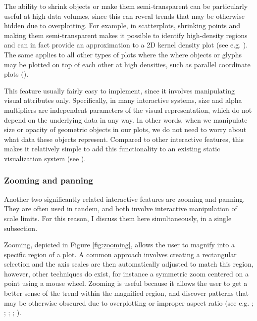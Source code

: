 \documentclass[
  openany]{book}
\theoremstyle{definition}
\theoremstyle{definition}
\theoremstyle{definition}
\theoremstyle{definition}
\theoremstyle{remark}
\begin{document}
The ability to shrink objects or make them semi-transparent can be particularly useful at high data volumes, since this can reveal trends that may be otherwise hidden due to overplotting. For example, in scatterplots, shrinking points and making them semi-transparent makes it possible to identify high-density regions and can in fact provide an approximation to a 2D kernel density plot (see e.g. ). The same applies to all other types of plots where the where objects or glyphs may be plotted on top of each other at high densities, such as parallel coordinate plots ().

This feature usually fairly easy to implement, since it involves manipulating visual attributes only. Specifically, in many interactive systems, size and alpha multipliers are independent parameters of the visual representation, which do not depend on the underlying data in any way. In other words, when we manipulate size or opacity of geometric objects in our plots, we do not need to worry about what data these objects represent. Compared to other interactive features, this makes it relatively simple to add this functionality to an existing static visualization system (see ).

\subsubsection{Zooming and panning}\label{zooming-and-panning}

Another two significantly related interactive features are zooming and panning. They are often used in tandem, and both involve interactive manipulation of scale limits. For this reason, I discuss them here simultaneously, in a single subsection.

Zooming, depicted in Figure \ref{fig:zooming}, allows the user to magnify into a specific region of a plot. A common approach involves creating a rectangular selection and the axis scales are then automatically adjusted to match this region, however, other techniques do exist, for instance a symmetric zoom centered on a point using a mouse wheel. Zooming is useful because it allows the user to get a better sense of the trend within the magnified region, and discover patterns that may be otherwise obscured due to overplotting or improper aspect ratio (see e.g. ; ; ; ; ).
\end{document}
